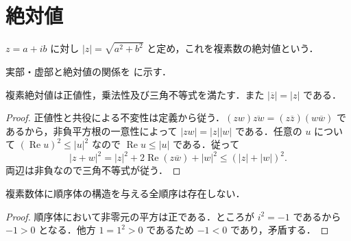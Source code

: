 \section{絶対値}
\begin{defn}[複素数の絶対値]
$z=a+ib$ に対し $|z|=\sqrt{a^2+b^2}$ と定め，これを複素数の絶対値という．
\end{defn}
実部・虚部と絶対値の関係を  に示す．
\begin{prop}[複素絶対値の基本性質]
複素絶対値は正値性，乗法性及び三角不等式を満たす．また $|\overline z|=|z|$ である．
\end{prop}
\begin{proof}
正値性と共役による不変性は定義から従う．$(zw)\overline{zw}=(z\overline z)(w\overline w)$ であるから，非負平方根の一意性によって $|zw|=|z||w|$ である．任意の $u$ について $(\operatorname{Re}u)^2\leq |u|^2$ なので $\operatorname{Re}u\leq |u|$ である．従って
\[
 |z+w|^2=|z|^2+2\operatorname{Re}(z\overline w)+|w|^2
 \leq (|z|+|w|)^2.
\]
両辺は非負なので三角不等式が従う．
\end{proof}
\begin{prop}[複素数体の非順序化可能性]
複素数体に順序体の構造を与える全順序は存在しない．
\end{prop}
\begin{proof}
順序体において非零元の平方は正である．ところが $i^2=-1$ であるから $-1>0$ となる．他方 $1=1^2>0$ であるため $-1<0$ であり，矛盾する．
\end{proof}
